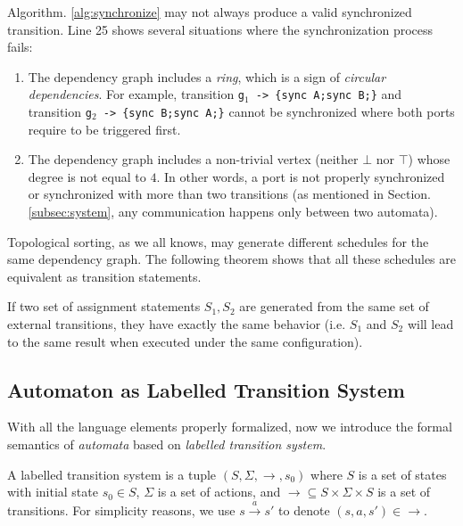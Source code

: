 Algorithm. \ref{alg:synchronize} may not always produce a valid synchronized transition. Line 25 shows several situations where the synchronization process fails:
\begin{enumerate}
    \item The dependency graph includes a \emph{ring}, which is a sign of \emph{circular dependencies}. For example, transition \texttt{g$_1$ -> \{sync A;sync B;\}} and transition \texttt{g$_2$ -> \{sync B;sync A;\}} cannot be synchronized where both ports require to be triggered first.
    \item The dependency graph includes a non-trivial vertex (neither $\bot$ nor $\top$) whose degree is not equal to $4$. In other words, a port is not properly synchronized or synchronized with more than two transitions (as mentioned in Section. \ref{subsec:system}, any communication happens only between two automata).
\end{enumerate}

Topological sorting, as we all knows, may generate different schedules for the same dependency graph. The following theorem shows that all these schedules are equivalent as transition statements.

\begin{theorem} If two set of assignment statements $S_1, S_2$ are generated from the same set of external transitions, they have exactly the same behavior (i.e. $S_1$ and $S_2$ will lead to the same result when executed under the same configuration).
\end{theorem}

\subsection{Automaton as Labelled Transition System}

With all the language elements properly formalized, now we introduce the formal semantics of \emph{automata} based on \emph{labelled transition system}.

\begin{definition}
    A labelled transition system is a tuple $(S,\Sigma,\rightarrow,s_0)$ where $S$ is a set of states with initial state $s_0\in S$, $\Sigma$ is a set of actions, and $\rightarrow\subseteq S\times\Sigma\times S$ is a set of transitions. For simplicity reasons, we use $s\xrightarrow{a} s'$ to denote $(s,a,s')\in\rightarrow$.
\end{definition}

